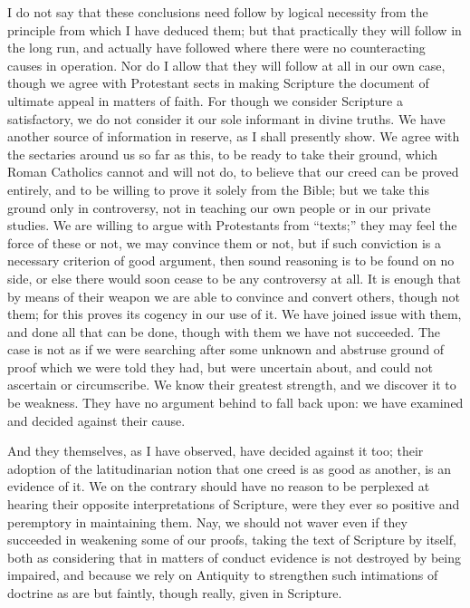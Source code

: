 I do not say that these conclusions need follow by logical
necessity from the principle from which I have deduced them; but that
practically they will follow in the long run, and actually have
followed where there were no counteracting causes in operation. Nor do
I allow that they will follow at all in our own case, though we agree
with Protestant sects in making Scripture the document of ultimate
appeal in matters of faith. For though we consider Scripture a
satisfactory, we do not consider it our sole informant in divine
truths. We have another source of information in reserve, as I shall
presently show. We agree with the sectaries around us so far as this,
to be ready to take their ground, which Roman Catholics cannot and
will not do, to believe that our creed can be proved entirely, and to
be willing to prove it solely from the Bible; but we take this ground
only in controversy, not in teaching our own people or in our private
studies. We are willing to argue with Protestants from
``texts;'' they may feel the force of these or not, we may
convince them or not, but if such conviction is a necessary criterion
of good argument, then sound reasoning is to be found on no side, or
else there would soon cease to be any controversy at all. It is enough
that by means of their weapon we are able to convince and convert
others, though not them; for this proves its cogency in our use of it.
We have joined issue with them, and done all that can be done, though
with them we have not succeeded. The case is not as if we were
searching after some unknown and abstruse ground of proof which we
were told they had, but were uncertain about, and could not
ascertain or circumscribe. We know their greatest strength, and we
discover it to be weakness. They have no argument behind to fall back
upon: we have examined and decided against their cause.

And they themselves, as I have observed, have decided against it
too; their adoption of the latitudinarian notion that one creed is as
good as another, is an evidence of it. We on the contrary should have
no reason to be perplexed at hearing their opposite interpretations of
Scripture, were they ever so positive and peremptory in maintaining
them. Nay, we should not waver even if they succeeded in weakening
some of our proofs, taking the text of Scripture by itself, both as
considering that in matters of conduct evidence is not destroyed by
being impaired, and because we rely on Antiquity to strengthen such
intimations of doctrine as are but faintly, though really, given in
Scripture.

